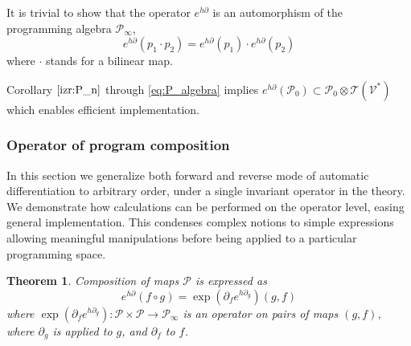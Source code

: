 \documentclass[smallcondensed]{svjour3}
\newcommand{\T}{\mathcal{T}}
\newcommand{\VV}{\mathcal{V}}
\newcommand{\dP}{\mathcal{P}}
\newcommand{\D}{\partial}
\newtheorem{izrek}{Theorem}[section]
\begin{document}
 It is trivial to show that the operator $e^{h\D}$ is an automorphism of the programming algebra $\dP_\infty$,
\begin{equation}
 	e^{h\D}(p_1\cdot p_2)=e^{h\D}(p_1)\cdot e^{h\D}(p_2)
 \end{equation}
 where $\cdot$ stands for a bilinear map.
 
 Corollary $\ref{izr:P_n}$ through \eqref{eq:P_algebra} implies
      	$e^{h\D}(\dP_0)\subset\dP_0\otimes \T(\VV^*)$      
 which enables efficient implementation. 
  
 \subsubsection{Operator of program composition}\label{sec:compsition}
 
 In this section we generalize both forward \cite{PcAD} and reverse \cite{ReverseAD} mode of automatic differentiation to arbitrary order, under a single invariant operator in the theory. We demonstrate how calculations can be performed on the operator level, easing general implementation. This condenses complex notions to simple expressions allowing meaningful manipulations before being applied to a particular programming space.
 
 \begin{izrek}\label{izr:kompo}
 Composition of maps $\dP$ is expressed as
 \begin{equation}\label{eq:kompo}
 e^{h\D}(f\circ g)=\exp(\D_fe^{h\D_g})(g,f)
 \end{equation}
 where $\exp(\D_fe^{h\D_g}):\dP\times\dP\to\dP_\infty$ is an operator on pairs of maps $(g,f)$, where $\D_g$ is applied to $g$, and $\D_f$ to $f$. 
 \end{izrek}
 
\end{document}
